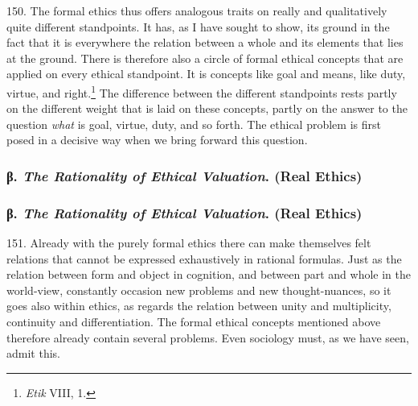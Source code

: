 \documentclass[12pt,a4paper]{book}
\newcommand{\opage}[1]{\marginnote{\footnotesize\textit{[#1]}}}
\begin{document}
150. The formal ethics thus offers analogous traits \opage{359}on really and qualitatively quite different standpoints. It
has, as I have sought to show, its ground in the fact that it is everywhere the relation between a whole and its
elements that lies at the ground. There is therefore also a circle of formal ethical concepts that are applied on
every ethical standpoint. It is concepts like goal and means, like duty, virtue, and right.\footnote{\emph{Etik} VIII,
1.} The difference between the different standpoints rests partly on the different weight that is laid on these
concepts, partly on the answer to the question \emph{what} is goal, virtue, duty, and so forth. The ethical problem
is first posed in a decisive way when we bring forward this question.

\subsubsection*{β. \emph{The Rationality of Ethical Valuation}. (Real Ethics)}

\subsubsection*{β. \emph{The Rationality of Ethical Valuation}. (Real Ethics)}

151. Already with the purely formal ethics there can make themselves felt relations that cannot be
expressed exhaustively in rational formulas. Just as the relation between form and object in cognition, and
between part and whole in the world-view, constantly occasion new problems and new thought-nuances, so it
goes also within ethics, as regards the relation between unity and multiplicity, continuity and
differentiation. The formal ethical concepts mentioned above therefore already contain several problems.
Even sociology must, as we have seen, admit this.
\end{document}
